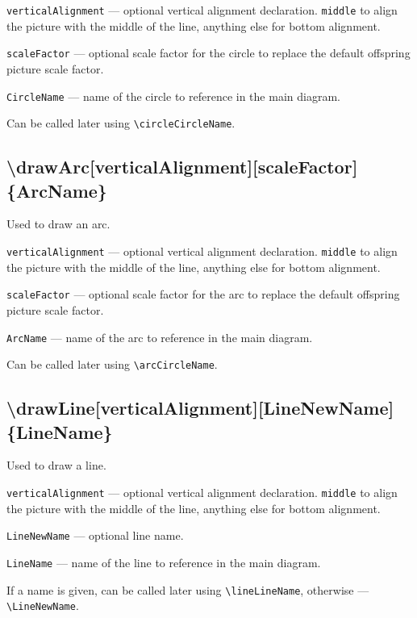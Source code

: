 \documentclass{ltxdoc}
\begin{document}
	\texttt{verticalAlignment} — optional vertical alignment declaration. \texttt{middle} to align the picture with the middle of the line, anything else for bottom alignment.
	
	\texttt{scaleFactor} — optional scale factor for the circle to replace the default offspring picture scale factor. 
	
	\texttt{CircleName} — name of the circle to reference in the main diagram. 
	
	Can be called later using \texttt{\textbackslash circleCircleName}.
	
\subsection{\textbackslash drawArc[verticalAlignment][scaleFactor]\{ArcName\}}

	Used to draw an arc.

	\texttt{verticalAlignment} — optional vertical alignment declaration. \texttt{middle} to align the picture with the middle of the line, anything else for bottom alignment.
	
	\texttt{scaleFactor} — optional scale factor for the arc to replace the default offspring picture scale factor. 
	
	\texttt{ArcName} — name of the arc to reference in the main diagram. 
	
	Can be called later using \texttt{\textbackslash arcCircleName}.
	
\subsection{\textbackslash drawLine[verticalAlignment][LineNewName]\{LineName\}}

	Used to draw a line.

	\texttt{verticalAlignment} — optional vertical alignment declaration. \texttt{middle} to align the picture with the middle of the line, anything else for bottom alignment.
	
	\texttt{LineNewName} — optional line name. 
	
	\texttt{LineName} — name of the line to reference in the main diagram. 
	
	If a name is given, can be called later using \texttt{\textbackslash lineLineName}, otherwise — \texttt{\textbackslash LineNewName}. 
	
\end{document}
